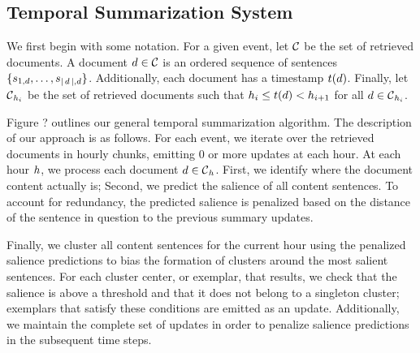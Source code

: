 \subsection{Temporal Summarization System}\label{sec:approach}


We first begin with some notation. For a given event, let $\corpus$ be the set
of retrieved documents. A document $\doc \in \corpus$ is an ordered sequence
of sentences $\{\sent_{1,\doc},\ldots,\sent_{|\doc|,\doc} \}$. 
Additionally, each document has a timestamp $\dtime(\doc)$. Finally, let 
$\corpus_{\hour_i}$ be the set of retrieved documents such that 
$\hour_i \le \dtime(\doc) < \hour_{i+1}$ for all $\doc \in \corpus_{\hour_i}$.

Figure ? outlines our general temporal summarization algorithm. The description
of our approach is as follows.
For each event, we iterate over the retrieved 
documents in hourly chunks, emitting 0 or more updates at each hour.
At each hour $\hour$, we process each document
$\doc \in \corpus_{\hour}$. First, we identify where the document content
actually is; Second, we predict the salience of all content sentences.
To account for redundancy, the predicted salience is penalized based on the 
distance of the sentence in question to the previous summary updates.

Finally, we cluster all content sentences 
for the current hour using the penalized salience predictions to bias the 
formation
of clusters around the most salient sentences. For each cluster center, or 
exemplar, that results, we check that the salience is above a threshold and 
that it does not belong to a singleton cluster; exemplars that satisfy these
conditions are emitted as an update.
Additionally, we maintain the complete set of updates in order to penalize
salience predictions in the subsequent time steps. 

